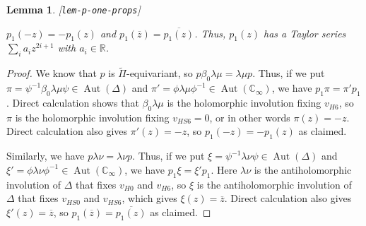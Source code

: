 \documentclass[reqno]{amsart}
\newcommand{\lbl}[1]{\label{#1}\textup{[\texttt{#1}]}\par}
\newcommand{\lbl}{\label}
\newcommand{\Aut}	{\operatorname{Aut}}
\newcommand{\Dl}        {\Delta}
\newcommand{\bt}        {\beta}
\newcommand{\lm}        {\lambda}
\newcommand{\R}         {{\mathbb{R}}}
\newcommand{\C}         {{\mathbb{C}}}
\newcommand{\ov}[1]     {\overline{#1}}
\newcommand{\tPi}	{\widetilde{\Pi}}
\renewcommand{\ss}{\scriptstyle}
\renewcommand{\:}{\colon}
\newtheorem{lemma}[theorem]{Lemma}
\theoremstyle{definition}
\begin{document}
\begin{center}
\end{center}

\begin{lemma}\lbl{lem-p-one-props}
 $p_1(-z)=-p_1(z)$ and $p_1(\ov{z})=\ov{p_1(z)}$.  Thus, $p_1(z)$ has
 a Taylor series $\sum_ia_iz^{2i+1}$ with $a_i\in\R$.
\end{lemma}
\begin{proof}
 We know that $p$ is $\tPi$-equivariant, so $p\bt_0\lm\mu=\lm\mu p$.
 Thus, if we put $\pi=\psi^{-1}\bt_0\lm\mu\psi\in\Aut(\Dl)$ and
 $\pi'=\phi\lm\mu\phi^{-1}\in\Aut(\C_\infty)$, we have
 $p_1\pi=\pi'p_1$.  Direct calculation
 shows that $\bt_0\lm\mu$ is the holomorphic involution fixing $v_{H6}$, so
 $\pi$ is the holomorphic involution fixing $v_{HS6}=0$, or in other
 words $\pi(z)=-z$.  Direct calculation also gives $\pi'(z)=-z$, so
 $p_1(-z)=-p_1(z)$ as claimed.

 Similarly, we have $p\lm\nu=\lm\nu p$.  Thus, if we put
 $\xi=\psi^{-1}\lm\nu\psi\in\Aut(\Dl)$ and
 $\xi'=\phi\lm\nu\phi^{-1}\in\Aut(\C_\infty)$, we have
 $p_1\xi=\xi'p_1$.  Here $\lm\nu$ is the antiholomorphic involution
 of $\Dl$ that fixes $v_{H0}$ and $v_{H6}$, so $\xi$ is the antiholomorphic
 involution of $\Dl$ that fixes $v_{HS0}$ and $v_{HS6}$, which gives
 $\xi(z)=\ov{z}$.  Direct calculation also gives $\xi'(z)=\ov{z}$, so
 $p_1(\ov{z})=\ov{p_1(z)}$ as claimed.
\end{proof}
\end{document}
